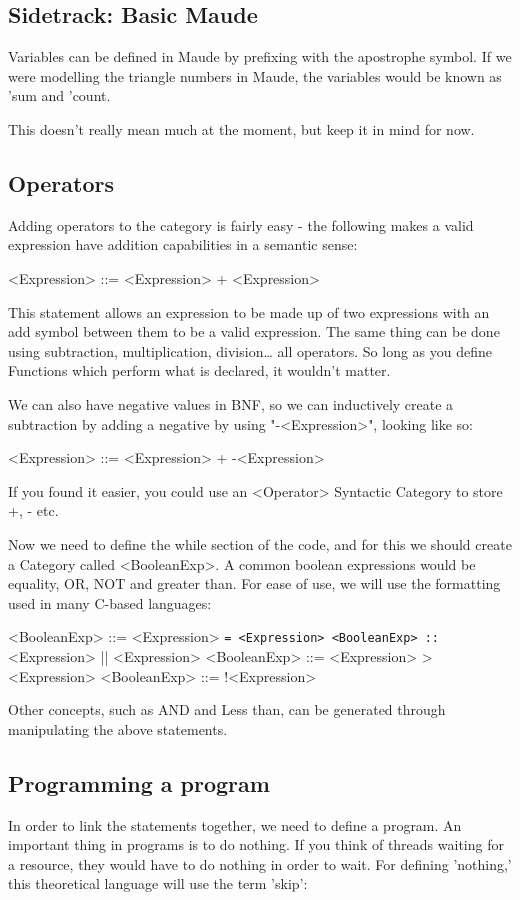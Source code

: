 \documentclass[12pt]{article}
\begin{document}
\subsection{Sidetrack: Basic Maude}
\label{sec-3-3}
Variables can be defined in Maude by prefixing with the apostrophe symbol.
If we were modelling the triangle numbers in Maude, the variables would be
known as 'sum and 'count.

This doesn't really mean much at the moment, but keep it in mind for now.

\subsection{Operators}
\label{sec-3-4}

Adding operators to the category is fairly easy - the following makes a valid
expression have addition capabilities in a semantic sense:

<Expression> ::= <Expression> + <Expression>

This statement allows an expression to be made up of two expressions with an
add symbol between them to be a valid expression.  The same thing can be done
using subtraction, multiplication, division\ldots{} all operators.  So long as you
define Functions which perform what is declared, it wouldn't matter.

We can also have negative values in BNF, so we can inductively create a
subtraction by adding a negative by using "-<Expression>", looking like so:

<Expression> ::= <Expression> + -<Expression>

If you found it easier, you could use an <Operator> Syntactic Category to store
+, - etc.

Now we need to define the while section of the code, and for this we should
create a Category called <BooleanExp>.  A common boolean expressions would be
equality, OR, NOT and greater than.  For ease of use, we will use the
formatting used in many C-based languages:

<BooleanExp> ::= <Expression> \texttt{= <Expression>
<BooleanExp> ::} <Expression> || <Expression>
<BooleanExp> ::= <Expression> >  <Expression>
<BooleanExp> ::= !<Expression>

Other concepts, such as AND and Less than, can be generated through
manipulating the above statements.

\subsection{Programming a program}
\label{sec-3-5}
In order to link the statements together, we need to define a program.  An
important thing in programs is to do nothing.  If you think of threads waiting
for a resource, they would have to do nothing in order to wait.  For defining
'nothing,' this theoretical language will use the term 'skip':
\end{document}
